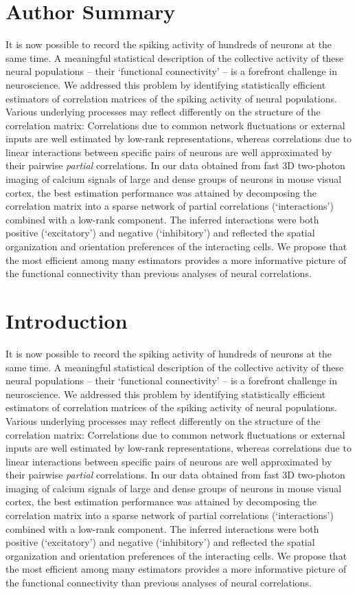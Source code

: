 \section*{Author Summary}
It is now possible to record the spiking activity of hundreds of neurons at the same time.  A meaningful statistical description of the collective activity of these neural populations -- their `functional connectivity' -- is a forefront challenge in neuroscience.  We addressed this problem by identifying statistically efficient estimators of correlation matrices of the spiking activity of neural populations.  Various underlying processes may reflect differently on the structure of the correlation matrix:  Correlations due to common network fluctuations or external inputs are well estimated by low-rank representations, whereas correlations due to linear interactions between specific pairs of neurons are well approximated by their pairwise \emph{partial} correlations.  In our data obtained from fast 3D two-photon imaging of calcium signals of large and dense groups of neurons in mouse visual cortex, the best estimation performance was attained by decomposing the correlation matrix into a sparse network of partial correlations (`interactions') combined with a low-rank component. The inferred interactions were both positive (`excitatory') and negative (`inhibitory') and reflected the spatial organization and orientation preferences of the interacting cells.  We propose that  the most efficient among many estimators provides a more informative picture of the functional connectivity than previous analyses of neural correlations.


\section*{Introduction}
It is now possible to record the spiking activity of hundreds of neurons at the same time.  A meaningful statistical description of the collective activity of these neural populations -- their `functional connectivity' -- is a forefront challenge in neuroscience.  We addressed this problem by identifying statistically efficient estimators of correlation matrices of the spiking activity of neural populations.  Various underlying processes may reflect differently on the structure of the correlation matrix:  Correlations due to common network fluctuations or external inputs are well estimated by low-rank representations, whereas correlations due to linear interactions between specific pairs of neurons are well approximated by their pairwise \emph{partial} correlations.  In our data obtained from fast 3D two-photon imaging of calcium signals of large and dense groups of neurons in mouse visual cortex, the best estimation performance was attained by decomposing the correlation matrix into a sparse network of partial correlations (`interactions') combined with a low-rank component. The inferred interactions were both positive (`excitatory') and negative (`inhibitory') and reflected the spatial organization and orientation preferences of the interacting cells.  We propose that  the most efficient among many estimators provides a more informative picture of the functional connectivity than previous analyses of neural correlations.

